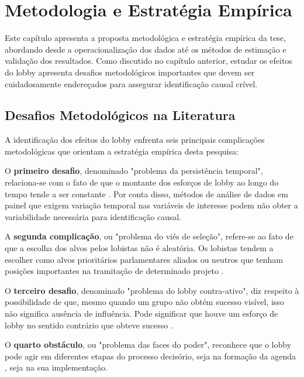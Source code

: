 \chapter{Metodologia e Estratégia Empírica}
\label{chapter:metodologia}

Este capítulo apresenta a proposta metodológica e estratégia empírica da tese, abordando desde a operacionalização dos dados até os métodos de estimação e validação dos resultados. Como discutido no capítulo anterior, estudar os efeitos do lobby apresenta desafios metodológicos importantes que devem ser cuidadosamente endereçados para assegurar identificação causal crível.

\section{Desafios Metodológicos na Literatura}

A identificação dos efeitos do lobby enfrenta seis principais complicações metodológicas que orientam a estratégia empírica desta pesquisa:

O \textbf{primeiro desafio}, denominado "problema da persistência temporal", relaciona-se com o fato de que o montante dos esforços de lobby ao longo do tempo tende a ser constante \cite{de_figueiredo_advancing_2014}. Por conta disso, métodos de análise de dados em painel que exigem variação temporal nas variáveis de interesse podem não obter a variabilidade necessária para identificação causal.

A \textbf{segunda complicação}, ou "problema do viés de seleção", refere-se ao fato de que a escolha dos alvos pelos lobistas não é aleatória. Os lobistas tendem a escolher como alvos prioritários parlamentares aliados \cite{kollman1998outside, caldeira2000lobbying, hojnacki2001pac} ou neutros \cite{holyoke2003choosing, kelleher2009political, bertrand2014whom, gawande2012lobbying} que tenham posições importantes na tramitação de determinado projeto \cite{marshall2010lobby}.

O \textbf{terceiro desafio}, denominado "problema do lobby contra-ativo", diz respeito à possibilidade de que, mesmo quando um grupo não obtém sucesso visível, isso não significa ausência de influência. Pode significar que houve um esforço de lobby no sentido contrário que obteve sucesso \cite{austen1996theory}.

O \textbf{quarto obstáculo}, ou "problema das faces do poder", reconhece que o lobby pode agir em diferentes etapas do processo decisório, seja na formação da agenda \cite{bachrach1962two}, seja na sua implementação.

